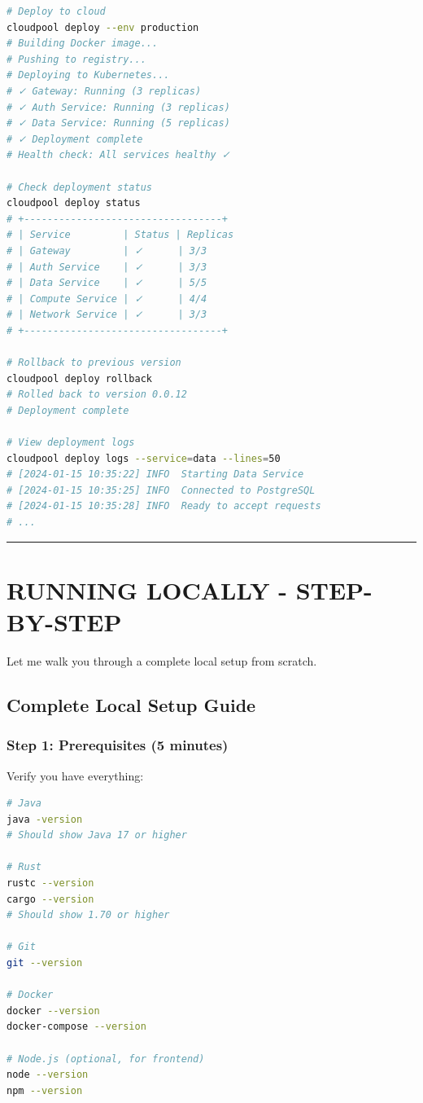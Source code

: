 \documentclass[11pt,a4paper]{report}
\begin{document}
\begin{lstlisting}[language=bash]
# Deploy to cloud
cloudpool deploy --env production
# Building Docker image...
# Pushing to registry...
# Deploying to Kubernetes...
# ✓ Gateway: Running (3 replicas)
# ✓ Auth Service: Running (3 replicas)
# ✓ Data Service: Running (5 replicas)
# ✓ Deployment complete
# Health check: All services healthy ✓

# Check deployment status
cloudpool deploy status
# +----------------------------------+
# | Service         | Status | Replicas
# | Gateway         | ✓      | 3/3
# | Auth Service    | ✓      | 3/3
# | Data Service    | ✓      | 5/5
# | Compute Service | ✓      | 4/4
# | Network Service | ✓      | 3/3
# +----------------------------------+

# Rollback to previous version
cloudpool deploy rollback
# Rolled back to version 0.0.12
# Deployment complete

# View deployment logs
cloudpool deploy logs --service=data --lines=50
# [2024-01-15 10:35:22] INFO  Starting Data Service
# [2024-01-15 10:35:25] INFO  Connected to PostgreSQL
# [2024-01-15 10:35:28] INFO  Ready to accept requests
# ...
\end{lstlisting}


\vfill\hrule\vfill



\part{RUNNING LOCALLY - STEP-BY-STEP}


Let me walk you through a complete local setup from scratch.


\chapter{Complete Local Setup Guide}



\section{Step 1: Prerequisites (5 minutes)}


Verify you have everything:

\begin{lstlisting}[language=bash]
# Java
java -version
# Should show Java 17 or higher

# Rust
rustc --version
cargo --version
# Should show 1.70 or higher

# Git
git --version

# Docker
docker --version
docker-compose --version

# Node.js (optional, for frontend)
node --version
npm --version
\end{lstlisting}
\end{document}
